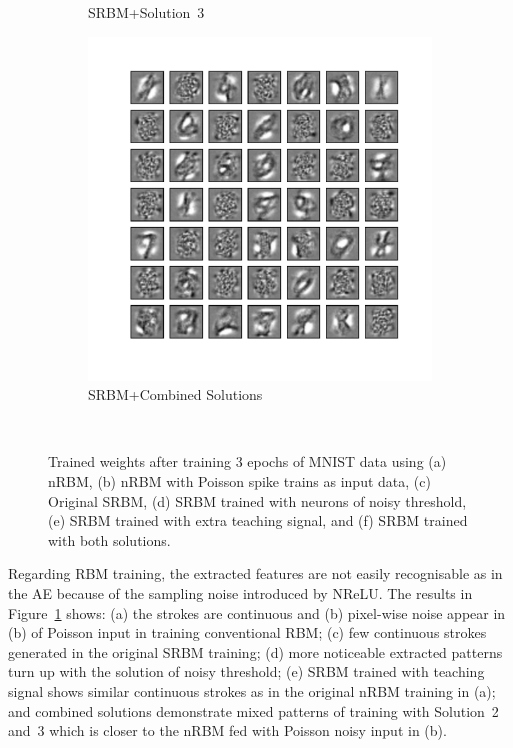 \begin{figure}
\begin{subfigure}[t]{0.4\textwidth}
		\caption{SRBM+Solution~3}
	\end{subfigure}
	\begin{subfigure}[t]{0.4\textwidth}
		\includegraphics[width=\textwidth]{pics_sdlm/53_MNIST_SRBM_all/2_60000_0.pdf}
		\caption{SRBM+Combined Solutions}
	\end{subfigure}\\
	\caption{Trained weights after training 3 epochs of MNIST data using (a) nRBM, (b) nRBM with Poisson spike trains as input data, (c) Original SRBM, (d) SRBM trained with neurons of noisy threshold, (e) SRBM trained with extra teaching signal, and (f) SRBM trained with both solutions.}
	\label{fig:weights_rbm}
\end{figure}

Regarding RBM training, the extracted features are not easily recognisable as in the AE because of the sampling noise introduced by NReLU.
The results in Figure~\ref{fig:weights_rbm} shows: (a) the strokes are continuous and (b) pixel-wise noise appear in (b) of Poisson input in training conventional RBM;
(c) few continuous strokes generated in the original SRBM training;
(d) more noticeable extracted patterns turn up with the solution of noisy threshold;
(e) SRBM trained with teaching signal shows similar continuous strokes as in the original nRBM training in (a);
and combined solutions demonstrate mixed patterns of training with Solution~2 and~3 which is closer to the nRBM fed with Poisson noisy input in (b). 


